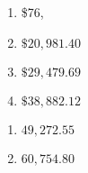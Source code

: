 \begin{multicols}{4}
\begin{enumerate}
\setcounter{enumi}{\value{HW}}

\item \$76,
\item $\$20,\!981.40$

\item $\$29,\!479.69$

\item  $\$38,\!882.12$ 

\setcounter{HW}{\value{enumi}}
\end{enumerate}
\end{multicols}

\begin{multicols}{4}
\begin{enumerate}
\setcounter{enumi}{\value{HW}}


\item $49,\!272.55$

\item  $60,\!754.80$
 
\setcounter{HW}{\value{enumi}}
\end{enumerate}

\end{multicols}

